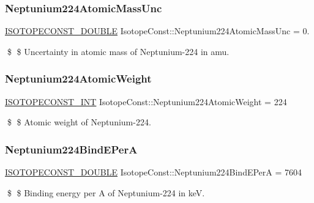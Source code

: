 \subsubsection{\texorpdfstring{Neptunium224\+Atomic\+Mass\+Unc}{Neptunium224AtomicMassUnc}}
{\footnotesize\ttfamily \mbox{\hyperlink{group___isotope_const-_macros_ga8f45a7272ce02c0b4c65c44636ed719a}{I\+S\+O\+T\+O\+P\+E\+C\+O\+N\+S\+T\+\_\+\+D\+O\+U\+B\+LE}} Isotope\+Const\+::\+Neptunium224\+Atomic\+Mass\+Unc = 0.}

\$ \$ Uncertainty in atomic mass of Neptunium-\/224 in amu. \mbox{\label{group___isotope_const-_neptunium-_np224_ga347c1096b8cc03403a742f358f6c54d0}} 
\subsubsection{\texorpdfstring{Neptunium224\+Atomic\+Weight}{Neptunium224AtomicWeight}}
{\footnotesize\ttfamily \mbox{\hyperlink{group___isotope_const-_macros_ga5f18360b3e99483a35c32d789e62621c}{I\+S\+O\+T\+O\+P\+E\+C\+O\+N\+S\+T\+\_\+\+I\+NT}} Isotope\+Const\+::\+Neptunium224\+Atomic\+Weight = 224}

\$ \$ Atomic weight of Neptunium-\/224. \mbox{\label{group___isotope_const-_neptunium-_np224_gaf36f54b5a3a61270906556d570e6c000}} 
\subsubsection{\texorpdfstring{Neptunium224\+Bind\+E\+PerA}{Neptunium224BindEPerA}}
{\footnotesize\ttfamily \mbox{\hyperlink{group___isotope_const-_macros_ga8f45a7272ce02c0b4c65c44636ed719a}{I\+S\+O\+T\+O\+P\+E\+C\+O\+N\+S\+T\+\_\+\+D\+O\+U\+B\+LE}} Isotope\+Const\+::\+Neptunium224\+Bind\+E\+PerA = 7604}

\$ \$ Binding energy per A of Neptunium-\/224 in keV. \mbox{\label{group___isotope_const-_neptunium-_np224_ga1fb16b3e4758ac57657b79f48603dc78}} 
